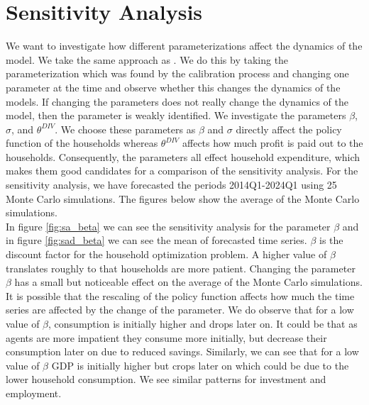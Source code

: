 
\chapter{Sensitivity Analysis} %

\label{Sensitivity Analysis} %
We want to investigate how different parameterizations affect the dynamics of the model. We take the same approach as \cite{caiani_agent_2016}. We do this by taking the parameterization which was found by the calibration process and changing one parameter at the time and observe whether this changes the dynamics of the models. If changing the parameters does not really change the dynamics of the model, then the parameter is weakly identified. We investigate the parameters $\beta$, $\sigma$, and $\theta^{DIV}$. We choose these parameters as $\beta$ and $\sigma$ directly affect the policy function of the households whereas $\theta^{DIV}$ affects how much profit is paid out to the households. Consequently, the parameters all effect household expenditure, which makes them good candidates for a comparison of the sensitivity analysis. For the sensitivity analysis, we have forecasted the periods 2014Q1-2024Q1 using 25 Monte Carlo simulations. The figures below show the average of the Monte Carlo simulations.\\

In figure \ref{fig:sa_beta} we can see the sensitivity analysis for the parameter $\beta$ and in figure \ref{fig:sad_beta}
 we can see the mean of forecasted time series. $\beta$ is the discount factor for the household optimization problem. A higher value of $\beta$ translates roughly to that households are more patient. Changing the parameter $\beta$ has a small but noticeable effect on the average of the Monte Carlo simulations. It is possible that the rescaling of the policy function affects how much the time series are affected by the change of the parameter. We do observe that for a low value of $\beta$, consumption is initially higher and drops later on. It could be that as agents are more impatient they consume more initially, but decrease their consumption later on due to reduced savings. Similarly, we can see that for a low value of $\beta$ GDP is initially higher but crops later on which could be due to the lower household consumption. We see similar patterns for investment and employment.\\

